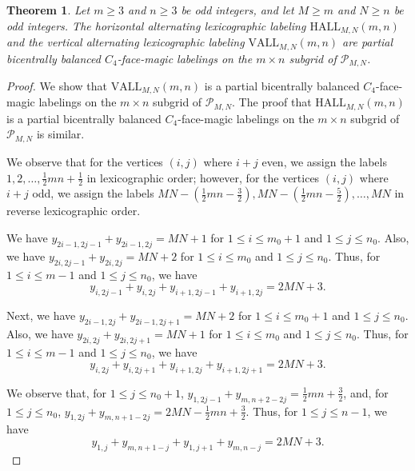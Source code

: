 \documentclass[12pt]{amsart}
\theoremstyle{definition}
\theoremstyle{plain}
\newtheorem{theorem}[definition]{Theorem}
\begin{document}
\begin{theorem} \label{thmHALLandVALLProjectiveLabelings}
  Let $m\geqslant 3$ and $n \geqslant 3$ be odd integers, and let $M \geqslant m$ and $N \geqslant n$ be odd integers.
  The horizontal alternating lexicographic labeling $\mathrm{HALL}_{M,N}(m,n)$ and the vertical alternating lexicographic labeling $\mathrm{VALL}_{M,N}(m,n)$
  are partial bicentrally balanced $C_4$-face-magic labelings on the $m \times n$ subgrid of $\mathcal{P}_{M,N}$.
\end{theorem}

\begin{proof}
  We show that $\mathrm{VALL}_{M,N}(m,n)$ is a partial bicentrally balanced $C_4$-face-magic labelings on the $m \times n$ subgrid of $\mathcal{P}_{M,N}$.
  The proof that $\mathrm{HALL}_{M,N}(m,n)$ is a partial bicentrally balanced $C_4$-face-magic labelings on the $m \times n$ subgrid of $\mathcal{P}_{M,N}$ is similar.

  We observe that for the vertices $(i,j)$ where $i+j$ even, we assign the labels $1,2,\ldots,\tfrac{1}{2}mn+\tfrac{1}{2}$ in lexicographic order;
however, for the vertices $(i,j)$ where $i+j$ odd, we assign the labels $MN-(\tfrac{1}{2}mn-\tfrac{3}{2}),MN-(\tfrac{1}{2}mn-\tfrac{5}{2}),\ldots,MN$ in reverse lexicographic order.

We have  $y_{2i-1,2j-1} + y_{2i-1,2j}=MN+1$ for $1 \leqslant i \leqslant m_0+1$ and  $1 \leqslant j \leqslant n_0$.
Also, we have $y_{2i,2j-1} + y_{2i,2j}=MN+2$  for $1 \leqslant i \leqslant m_0$ and $1 \leqslant j \leqslant n_0$.
Thus, for $1 \leqslant i \leqslant m-1$ and  $1 \leqslant j \leqslant n_0$, we have
\begin{equation*}
  y_{i,2j-1} + y_{i,2j} + y_{i+1,2j-1} + y_{i+1,2j}=2MN+3.
\end{equation*}

Next, we have $y_{2i-1,2j} + y_{2i-1,2j+1}=MN+2$ for $1 \leqslant i \leqslant m_0+1$ and $1 \leqslant j \leqslant n_0$.
Also, we have $y_{2i,2j} + y_{2i,2j+1}=MN+1$ for $1 \leqslant i \leqslant m_0$ and $1 \leqslant j \leqslant n_0$.
Thus, for $1 \leqslant i \leqslant m-1$ and  $1 \leqslant j \leqslant n_0$, we have
\begin{equation*}
  y_{i,2j} + y_{i,2j+1} + y_{i+1,2j} + y_{i+1,2j+1}=2MN+3.
\end{equation*}

We observe that, for $1\leqslant j \leqslant n_0 +1$, $y_{1,2j-1} +y_{m,n+2-2j}=\tfrac{1}{2}mn+\tfrac{3}{2}$, and,
for $1\leqslant j \leqslant n_0$, $y_{1,2j} +y_{m,n+1-2j}=2MN - \tfrac{1}{2}mn+\tfrac{3}{2}$.
Thus, for $1\leqslant j \leqslant n-1$, we have
\begin{equation*}
  y_{1,j} +y_{m,n+1-j} +  y_{1,j+1} +y_{m,n-j} =2MN+3.
\end{equation*}


\end{proof}
\end{document}
